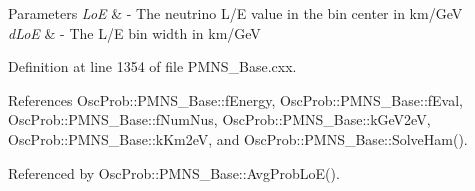 \begin{DoxyParams}{Parameters}
{\em LoE} & -\/ The neutrino L/E value in the bin center in km/\+GeV \\
\hline
{\em d\+LoE} & -\/ The L/E bin width in km/\+GeV \\
\hline
\end{DoxyParams}


Definition at line 1354 of file P\+M\+N\+S\+\_\+\+Base.\+cxx.



References Osc\+Prob\+::\+P\+M\+N\+S\+\_\+\+Base\+::f\+Energy, Osc\+Prob\+::\+P\+M\+N\+S\+\_\+\+Base\+::f\+Eval, Osc\+Prob\+::\+P\+M\+N\+S\+\_\+\+Base\+::f\+Num\+Nus, Osc\+Prob\+::\+P\+M\+N\+S\+\_\+\+Base\+::k\+Ge\+V2eV, Osc\+Prob\+::\+P\+M\+N\+S\+\_\+\+Base\+::k\+Km2eV, and Osc\+Prob\+::\+P\+M\+N\+S\+\_\+\+Base\+::\+Solve\+Ham().



Referenced by Osc\+Prob\+::\+P\+M\+N\+S\+\_\+\+Base\+::\+Avg\+Prob\+Lo\+E().


